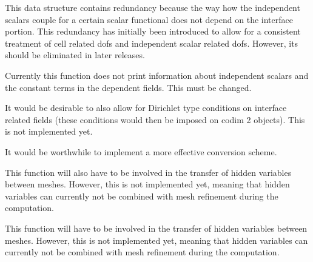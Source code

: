 \begin{DoxyRefList}
\item[\label{todo__todo000004}%
\hypertarget{todo__todo000004}{}%
Member \hyperlink{class_assembly_helper_a311e176038ee2b7ca0719abb384ca57b}{Assembly\+Helper$<$ spacedim $>$\+:\+:coupled\+\_\+\+C\+\_\+indices\+\_\+scalar\+\_\+functionals\+\_\+interface} ]This data structure contains redundancy because the way how the independent scalars couple for a certain scalar functional does not depend on the interface portion. This redundancy has initially been introduced to allow for a consistent treatment of cell related dofs and independent scalar related dofs. However, its should be eliminated in later releases.  
\item[\label{todo__todo000006}%
\hypertarget{todo__todo000006}{}%
Member \hyperlink{class_assembly_helper_afd598b93397e6af53f0e4e274e6f880e}{Assembly\+Helper$<$ spacedim $>$\+:\+:print\+\_\+assembly\+\_\+helper\+\_\+definition} (const bool detailed\+\_\+printout\+\_\+shapefuns=true) const ]Currently this function does not print information about independent scalars and the constant terms in the dependent fields. This must be changed. 
\item[\label{todo__todo000008}%
\hypertarget{todo__todo000008}{}%
Class \hyperlink{class_dirichlet_constraint}{Dirichlet\+Constraint$<$ spacedim $>$} ]It would be desirable to also allow for Dirichlet type conditions on interface related fields (these conditions would then be imposed on codim 2 objects). This is not implemented yet. 
\item[\label{todo__todo000009}%
\hypertarget{todo__todo000009}{}%
Member \hyperlink{class_do_f_renumbering_offset_a5df6c4b70b1394c3670ced634146c9a9}{Do\+F\+Renumbering\+Offset\+:\+:dof\+\_\+offsets} ]It would be worthwhile to implement a more effective conversion scheme.  
\item[\label{todo__todo000014}%
\hypertarget{todo__todo000014}{}%
Member \hyperlink{classparallel_1_1_triangulation_system_a951181f2ad877283d458fa19db42efb2}{parallel\+:\+:Triangulation\+System$<$ spacedim $>$\+:\+:post\+\_\+refinement\+\_\+domain} ()]This function will also have to be involved in the transfer of hidden variables between meshes. However, this is not implemented yet, meaning that hidden variables can currently not be combined with mesh refinement during the computation.  
\item[\label{todo__todo000013}%
\hypertarget{todo__todo000013}{}%
Member \hyperlink{classparallel_1_1_triangulation_system_a79e9789e83e12900c85cf8de0644271f}{parallel\+:\+:Triangulation\+System$<$ spacedim $>$\+:\+:pre\+\_\+refinement\+\_\+domain} ()]This function will have to be involved in the transfer of hidden variables between meshes. However, this is not implemented yet, meaning that hidden variables can currently not be combined with mesh refinement during the computation.  

\end{DoxyRefList}
